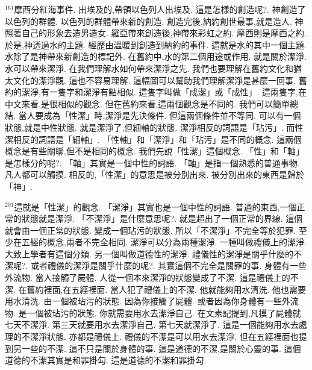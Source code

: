 \documentclass{book}
\begin{document}
$^{161}$摩西分紅海事件.
出埃及的,帶領以色列人出埃及.
這是怎樣的創造呢?.
神創造了以色列的群體.
以色列的群體帶來新的創造.
創造完後,納約創世最事,就是造人.
神照著自己的形象去造男造女.
羅亞帶來創造後,神帶來彩虹之約.
摩西則是摩西之約.
於是,神透過水的主題.
經歷由溫暖到創造到納約的事件.
這就是水的其中一個主題.
水除了是神帶來新創造的標記外.
在舊約中,水的第二個用途或作用.
就是關於潔淨.
水可以帶來潔淨.
在我們理解水如何帶來潔淨之先.
我們也要理解在舊約文化和猶太文化的潔淨觀.
這也不容易理解.
這幅圖可以幫助我們理解潔淨是甚麼一回事.
舊約的潔淨,有一隻字和潔淨有點相似.
這隻字叫做「成潔」或「成性」.
這兩隻字,在中文來看,是很相似的觀念.
但在舊約來看,這兩個觀念是不同的.
我們可以簡單總結.
當人要成為「性潔」時,潔淨是先決條件.
但這兩個條件並不等同.
可以有一個狀態,就是中性狀態.
就是潔淨了,但細軸的狀態.
潔淨相反的詞語是「玷污」.
而性潔相反的詞語是「細軸」.
「性軸」和「潔淨」和「玷污」是不同的概念.
這兩個概念是有些關聯,但不是相同的概念.
我們先說「性潔」這個概念.
「性」和「軸」是怎樣分的呢?.
「軸」其實是一個中性的詞語.
「軸」是指一個熟悉的普通事物.
凡人都可以觸摸.
相反的,「性潔」的意思是被分別出來.
被分別出來的東西是歸於「神」.

$^{201}$這就是「性潔」的觀念.
「潔淨」其實也是一個中性的詞語.
普通的東西,一個正常的狀態就是潔淨.
「不潔淨」是什麼意思呢?.
就是超出了一個正常的界線.
這個就會由一個正常的狀態.
變成一個玷污的狀態.
所以「不潔淨」不完全等於犯罪.
至少在五經的概念,兩者不完全相同.
潔淨可以分為兩種潔淨.
一種叫做禮儀上的潔淨.
大致上學者有這個分類.
另一個叫做道德性的潔淨.
禮儀性的潔淨是關乎什麼的不潔呢?.
或者禮儀的潔淨是關乎什麼的呢?.
其實這個不完全是關罪的事.
身體有一些外流物.
當人接觸了屍體.
人從一個本來潔淨的狀態變成了不潔.
這是禮儀上的不潔.
在舊約裡面,在五經裡面.
當人犯了禮儀上的不潔.
他就能夠用水清洗.
他也需要用水清洗.
由一個被玷污的狀態.
因為你接觸了屍體.
或者因為你身體有一些外流物.
是一個被玷污的狀態.
你就需要用水去潔淨自己.
在文素記提到,凡摸了屍體就七天不潔淨.
第三天就要用水去潔淨自己.
第七天就潔淨了.
這是一個能夠用水去處理的不潔淨狀態.
亦都是禮儀上.
禮儀的不潔是可以用水去潔淨.
但在五經裡面也提到另一些的不潔.
這不只是關於身體的事.
這是道德的不潔,是關於心靈的事.
這個道德的不潔其實是和罪掛勾.
這是道德的不潔和罪掛勾.
\end{document}
